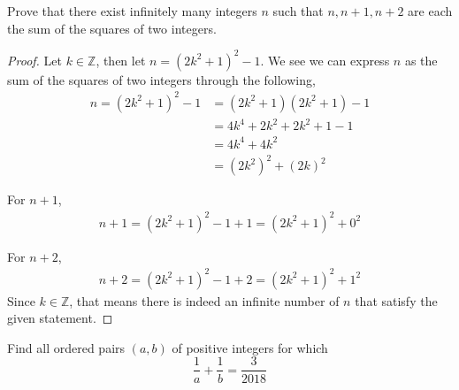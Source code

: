 \documentclass[11pt]{article}
\newenvironment{problem}[2][Problem\!]{\begin{trivlist}
\item[\hskip \labelsep {\bfseries #1}\hskip \labelsep {\bfseries #2}]}{\end{trivlist}}
\newcommand{\zz}{\mathbb Z}   %
\begin{document}
\begin{tcolorbox}
    \begin{problem} {OC | 10/15 | 37 (Putnam)}
        Prove that there exist infinitely many integers $n$ such that $n,n+1,n +2$ are each the sum of the squares of two integers. 
    \end{problem}
\end{tcolorbox}
\begin{proof}
    Let $k \in \zz$, then let $n = (2k^{2} + 1)^{2} -1$. We see we can express $n$ as the sum of the squares of two integers through the following,
    \begin{align*}
       n =  (2k^{2}+1)^{2} -1 &= (2k^{2} + 1)(2k^{2} + 1) -1 \\
        &= 4k^{4} +2k^{2} + 2k^{2} + 1 -1 \\
        &= 4k^{4} + 4k^{2} \\
        &= (2k^{2})^{2} + (2k)^{2}
    \end{align*}

    For $n+1$,
    \begin{align*}
         n +1 = (2k^{2} + 1)^{2} -1 + 1 = (2k^{2} + 1)^{2} + 0^{2}
    \end{align*}
    
    For $n+2$, 
    \begin{align*}
        n +2 = (2k^{2} +1)^{2} -1 + 2 = (2k^{2} +1)^{2} + 1^{2}
    \end{align*}
    Since $k \in \zz$, that means there is indeed an infinite number of $n$ that satisfy the given statement.
\end{proof}
\newpage
\begin{tcolorbox}
    \begin{problem} {OC | 11/22 | PP 19}
        Find all ordered pairs $(a,b)$ of positive integers for which
        \[\frac{1}{a} + \frac{1}{b} = \frac{3}{2018}\]
    \end{problem}
\end{tcolorbox}
\end{document}
